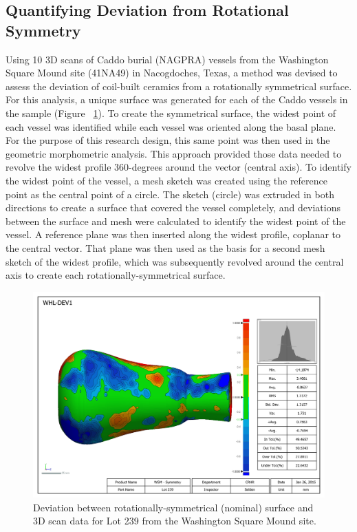 \documentclass[preprint,12pt]{elsarticle}
\begin{document}
\subsection{Quantifying Deviation from Rotational Symmetry}

Using 10 3D scans of Caddo burial (NAGPRA) vessels from the Washington Square Mound site (41NA49) in Nacogdoches, Texas, a method was devised to assess the deviation of coil-built ceramics from a rotationally symmetrical surface. For this analysis, a unique surface was generated for each of the Caddo vessels in the sample (Figure ~\ref{fig:Figure 5}). To create the symmetrical surface, the widest point of each vessel was identified while each vessel was oriented along the basal plane. For the purpose of this research design, this same point was then used in the geometric morphometric analysis. This approach provided those data needed to revolve the widest profile 360-degrees around the vector (central axis). To identify the widest point of the vessel, a mesh sketch was created using the reference point as the central point of a circle. The sketch (circle) was extruded in both directions to create a surface that covered the vessel completely, and deviations between the surface and mesh were calculated to identify the widest point of the vessel. A reference plane was then inserted along the widest profile, coplanar to the central vector. That plane was then used as the basis for a second mesh sketch of the widest profile, which was subsequently revolved around the central axis to create each rotationally-symmetrical surface.

\begin{figure}[ht]\centering
\includegraphics[width=\linewidth]{Selden-2017-Figure3}
\caption{Deviation between rotationally-symmetrical (nominal) surface and 3D scan data for Lot 239 from the Washington Square Mound site.}
\label{fig:Figure 5}
\end{figure}
\end{document}
